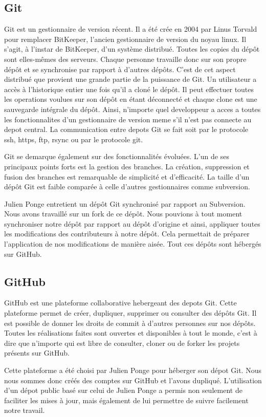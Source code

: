 \subsection{Git}
Git est un gestionnaire de version récent. Il a été crée en 2004 par Linus Torvald pour remplacer BitKeeper, l'ancien gestionnaire de version du noyau linux.
Il s'agit, à l'instar de BitKeeper, d'un système distribué. Toutes les copies du dépôt sont elles-mêmes des serveurs.
Chaque personne travaille donc sur son propre dépôt et se synchronise par rapport à d'autres dépôts. C'est de cet aspect distribué que provient une grande partie de la puissance de Git.
Un utilisateur a accès à l'historique entier une fois qu'il a cloné le dépôt. Il peut effectuer toutes les operations voulues sur son dépôt en étant déconnecté et chaque clone est une sauvegarde intégrale du dépôt.
Ainsi, n'importe quel developpeur a acces a toutes les fonctionnalites d'un gestionnaire de version meme s'il n'est pas connecte au depot central.
La communication entre depots Git se fait soit par le protocole ssh, https, ftp, rsync ou par le protocole git.

Git se demarque également sur des fonctionnalités évoluées. L'un de ses principaux points forts est la gestion des branches. La création, suppression et fusion des branches est remarquable de simplicité et d'efficacité.
La taille d'un dépôt Git est faible comparée à celle d'autres gestionnaires comme subversion.

Julien Ponge entretient un dépôt Git synchronisé par rapport au Subversion. Nous avons travaillé sur un fork de ce dépôt.
Nous pouvions à tout moment synchroniser notre dépôt par rapport au dépôt d'origine et ainsi, appliquer toutes les modifications des contributeurs à notre dépôt.
Cela permettait de préparer l'application de nos modifications de manière aisée. Tout ces dépôts sont hébergés sur GitHub.
\subsection{GitHub}
GitHub est une plateforme collaborative hebergeant des depots Git. Cette plateforme permet de créer, dupliquer, supprimer ou consulter des dépôts Git.
Il est possible de donner les droits de commit à d'autres personnes sur nos dépôts. Toutes les réalisations faites sont ouvertes et disponibles à tout le monde, c'est à dire que n'importe qui est libre de consulter, cloner ou de forker les projets présents sur GitHub.

Cette plateforme a été choisi par Julien Ponge pour héberger son dépot Git. Nous nous sommes donc créés des comptes sur GitHub et l'avons dupliqué. L'utilisation d'un dépot public basé sur celui de Julien Ponge a permis non seulement de faciliter les mises à jour, mais également de lui permettre de suivre facilement notre travail.


